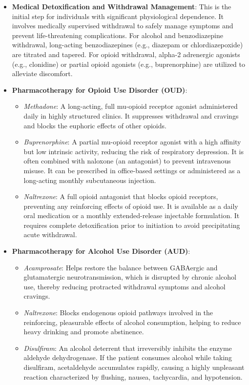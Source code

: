 \begin{itemize}
    \item \textbf{Medical Detoxification and Withdrawal Management}: This is the initial step for individuals with significant physiological dependence. It involves medically supervised withdrawal to safely manage symptoms and prevent life-threatening complications. For alcohol and benzodiazepine withdrawal, long-acting benzodiazepines (e.g., diazepam or chlordiazepoxide) are titrated and tapered. For opioid withdrawal, alpha-2 adrenergic agonists (e.g., clonidine) or partial opioid agonists (e.g., buprenorphine) are utilized to alleviate discomfort.
    \item \textbf{Pharmacotherapy for Opioid Use Disorder (OUD)}:
    \begin{itemize}
        \item \textit{Methadone}: A long-acting, full mu-opioid receptor agonist administered daily in highly structured clinics. It suppresses withdrawal and cravings and blocks the euphoric effects of other opioids.
        \item \textit{Buprenorphine}: A partial mu-opioid receptor agonist with a high affinity but low intrinsic activity, reducing the risk of respiratory depression. It is often combined with naloxone (an antagonist) to prevent intravenous misuse. It can be prescribed in office-based settings or administered as a long-acting monthly subcutaneous injection.
        \item \textit{Naltrexone}: A full opioid antagonist that blocks opioid receptors, preventing any reinforcing effects of opioid use. It is available as a daily oral medication or a monthly extended-release injectable formulation. It requires complete detoxification prior to initiation to avoid precipitating acute withdrawal.
    \end{itemize}
    \item \textbf{Pharmacotherapy for Alcohol Use Disorder (AUD)}:
    \begin{itemize}
        \item \textit{Acamprosate}: Helps restore the balance between GABAergic and glutamatergic neurotransmission, which is disrupted by chronic alcohol use, thereby reducing protracted withdrawal symptoms and alcohol cravings.
        \item \textit{Naltrexone}: Blocks endogenous opioid pathways involved in the reinforcing, pleasurable effects of alcohol consumption, helping to reduce heavy drinking and promote abstinence.
        \item \textit{Disulfiram}: An alcohol deterrent that irreversibly inhibits the enzyme aldehyde dehydrogenase. If the patient consumes alcohol while taking disulfiram, acetaldehyde accumulates rapidly, causing a highly unpleasant reaction characterized by flushing, nausea, tachycardia, and hypotension.

\end{itemize}
\end{itemize}
